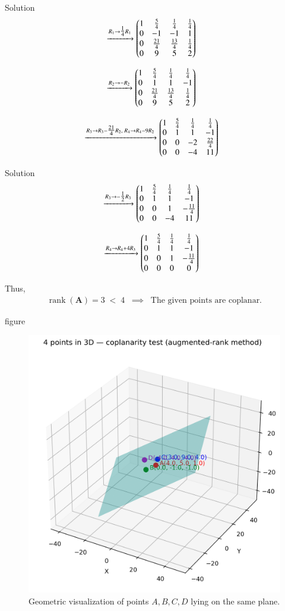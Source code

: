 \documentclass{beamer}
\begin{document}
\begin{frame}{Solution}
\begin{align}
&\xrightarrow{R_1 \to \tfrac{1}{4}R_1}
\begin{pmatrix}
1 & \tfrac{5}{4} & \tfrac{1}{4} & \tfrac{1}{4} \\
0 & -1 & -1 & 1 \\
0 & \tfrac{21}{4} & \tfrac{13}{4} & \tfrac{1}{4} \\
0 & 9 & 5 & 2
\end{pmatrix}
\end{align}

\begin{align}
&\xrightarrow{R_2 \to -R_2}
\begin{pmatrix}
1 & \tfrac{5}{4} & \tfrac{1}{4} & \tfrac{1}{4} \\
0 & 1 & 1 & -1 \\
0 & \tfrac{21}{4} & \tfrac{13}{4} & \tfrac{1}{4} \\
0 & 9 & 5 & 2
\end{pmatrix}
\end{align}

\begin{align}
&\xrightarrow{R_3 \to R_3 - \tfrac{21}{4}R_2,\; R_4 \to R_4 - 9R_2}
\begin{pmatrix}
1 & \tfrac{5}{4} & \tfrac{1}{4} & \tfrac{1}{4} \\
0 & 1 & 1 & -1 \\
0 & 0 & -2 & \tfrac{22}{4} \\
0 & 0 & -4 & 11
\end{pmatrix}
\end{align}
\end{frame}
\begin{frame}{Solution}
\begin{align}
&\xrightarrow{R_3 \to -\tfrac{1}{2}R_3}
\begin{pmatrix}
1 & \tfrac{5}{4} & \tfrac{1}{4} & \tfrac{1}{4} \\
0 & 1 & 1 & -1 \\
0 & 0 & 1 & -\tfrac{11}{4} \\
0 & 0 & -4 & 11
\end{pmatrix}
\end{align}

\begin{align}
&\xrightarrow{R_4 \to R_4 + 4R_3}
\begin{pmatrix}
1 & \tfrac{5}{4} & \tfrac{1}{4} & \tfrac{1}{4} \\
0 & 1 & 1 & -1 \\
0 & 0 & 1 & -\tfrac{11}{4} \\
0 & 0 & 0 & 0
\end{pmatrix}
\end{align}

Thus,
\begin{align}
\operatorname{rank}(\mathbf{A}) = 3 \;<\; 4 \;\;\implies\;\;
\text{The given points are coplanar.}
\end{align}
\end{frame}
\begin{frame}{figure}
\begin{figure}[H]
    \centering
    \includegraphics[width=0.45\linewidth]{figures/points_coplanarity.png}
    \caption{Geometric visualization of points $A, B, C, D$ lying on the same plane.}
    \label{fig:coplanarity}
\end{figure}    
\end{frame}
\end{document}
